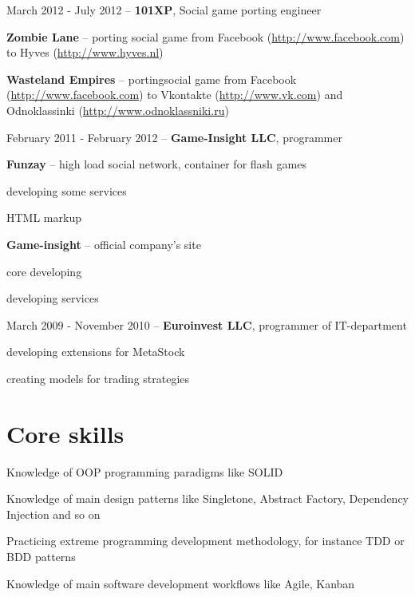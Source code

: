 \documentclass[10pt, a4paper, english]{article}
\begin{document}
\begin {list}{\textbullet}{}
  \item March 2012 - July 2012 -- \textbf{101XP}, Social game porting engineer
    \begin {list}{\textbullet}{}
      \item \textbf{Zombie Lane} -- porting social game from Facebook (\url{http://www.facebook.com}) to Hyves (\url{http://www.hyves.nl})
      \item \textbf{Wasteland Empires} -- portingsocial game from Facebook
        (\url{http://www.facebook.com}) to Vkontakte (\url{http://www.vk.com}) and Odnoklassinki (\url{http://www.odnoklassniki.ru})
    \end {list}

  \item February 2011 - February 2012 -- \textbf{Game-Insight LLC}, programmer
    \begin {list}{\textbullet}{}
      \item \textbf{Funzay} -- high load social network, container for flash games
        \begin {list}{\textbullet}{}
          \item developing some services
          \item HTML markup 
        \end {list} 
      \item \textbf{Game-insight} -- official company's site
        \begin {list}{\textbullet}{}
          \item core developing
          \item developing services
        \end {list}
    \end {list}

  \item March 2009 - November 2010 -- \textbf{Euroinvest LLC}, programmer of IT-department
    \begin {list}{\textbullet}{}
      \item developing extensions for MetaStock
      \item creating models for trading strategies
    \end {list}
\end {list}


\section* {Core skills}
\begin {list}{\textbullet}{}
\item Knowledge of OOP programming paradigms like SOLID
\item Knowledge of main design patterns like Singletone, Abstract Factory, Dependency Injection and so on
\item Practicing extreme programming development methodology, for instance TDD or BDD patterns 
\item Knowledge of main software development workflows like Agile, Kanban
\end{list}
\end{document}
